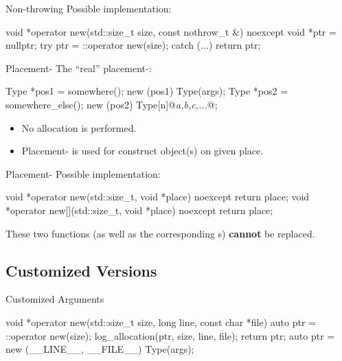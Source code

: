 \documentclass{beamer}
\begin{document}
\begin{frame}[fragile]{Non-throwing }
  Possible implementation:
  \begin{cpp}
void *operator new(std::size_t size,
                   const nothrow_t &) noexcept {
  void *ptr = nullptr;
  try {
    ptr = ::operator new(size);
  } catch (...) {}
  return ptr;
}
  \end{cpp}
\end{frame}

\begin{frame}[fragile]{Placement-}
  The ``real'' placement-:
  \begin{cpp}
Type *pos1 = somewhere();
new (pos1) Type(args);
Type *pos2 = somewhere_else();
new (pos2) Type[n]{@\textit{a,b,c,...}@};
  \end{cpp}
  \begin{itemize}
    \item No allocation is performed.
    \item Placement- is used for construct object(s) on given place.
  \end{itemize}
\end{frame}

\begin{frame}[fragile]{Placement-}
  Possible implementation:
  \begin{cpp}
void *operator new(std::size_t, void *place) noexcept {
  return place;
}
void *operator new[](std::size_t, void *place) noexcept {
  return place;
}
  \end{cpp}
  \begin{notice}
    These two functions (as well as the corresponding s) \textbf{cannot} be replaced.
  \end{notice}
\end{frame}

\subsection{Customized Versions}

\begin{frame}[fragile]{Customized Arguments}
  \begin{cpp}
void *operator new(std::size_t size,
                   long line, const char *file) {
  auto ptr = ::operator new(size);
  log_allocation(ptr, size, line, file);
  return ptr;
}
auto ptr = new (__LINE__, __FILE__) Type(args);
  \end{cpp}
\end{frame}
\end{document}
